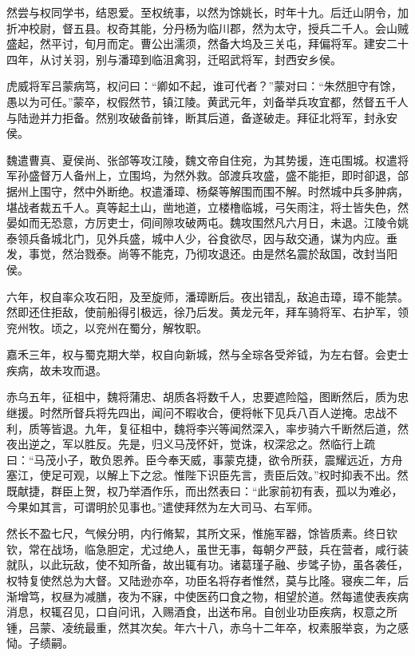 \documentclass[12pt,UTF8]{ctexbook}
\begin{document}
然尝与权同学书，结恩爱。至权统事，以然为馀姚长，时年十九。后迁山阴令，加折冲校尉，督五县。权奇其能，分丹杨为临川郡，然为太守，授兵二千人。会山贼盛起，然平讨，旬月而定。曹公出濡须，然备大坞及三关屯，拜偏将军。建安二十四年，从讨关羽，别与潘璋到临沮禽羽，迁昭武将军，封西安乡侯。

虎威将军吕蒙病笃，权问曰：“卿如不起，谁可代者？”蒙对曰：“朱然胆守有馀，愚以为可任。”蒙卒，权假然节，镇江陵。黄武元年，刘备举兵攻宜都，然督五千人与陆逊并力拒备。然别攻破备前锋，断其后道，备遂破走。拜征北将军，封永安侯。

魏遣曹真、夏侯尚、张郃等攻江陵，魏文帝自住宛，为其势援，连屯围城。权遣将军孙盛督万人备州上，立围坞，为然外救。郃渡兵攻盛，盛不能拒，即时卻退，郃据州上围守，然中外断绝。权遣潘璋、杨粲等解围而围不解。时然城中兵多肿病，堪战者裁五千人。真等起土山，凿地道，立楼橹临城，弓矢雨注，将士皆失色，然晏如而无恐意，方厉吏士，伺间隙攻破两屯。魏攻围然凡六月日，未退。江陵令姚泰领兵备城北门，见外兵盛，城中人少，谷食欲尽，因与敌交通，谋为内应。垂发，事觉，然治戮泰。尚等不能克，乃彻攻退还。由是然名震於敌国，改封当阳侯。

六年，权自率众攻石阳，及至旋师，潘璋断后。夜出错乱，敌追击璋，璋不能禁。然即还住拒敌，使前船得引极远，徐乃后发。黄龙元年，拜车骑将军、右护军，领兖州牧。顷之，以兖州在蜀分，解牧职。

嘉禾三年，权与蜀克期大举，权自向新城，然与全琮各受斧钺，为左右督。会吏士疾病，故未攻而退。

赤乌五年，征柤中，魏将蒲忠、胡质各将数千人，忠要遮险隘，图断然后，质为忠继援。时然所督兵将先四出，闻问不暇收合，便将帐下见兵八百人逆掩。忠战不利，质等皆退。九年，复征柤中，魏将李兴等闻然深入，率步骑六千断然后道，然夜出逆之，军以胜反。先是，归义马茂怀奸，觉诛，权深忿之。然临行上疏曰：“马茂小子，敢负恩养。臣今奉天威，事蒙克捷，欲令所获，震耀远近，方舟塞江，使足可观，以解上下之忿。惟陛下识臣先言，责臣后效。”权时抑表不出。然既献捷，群臣上贺，权乃举酒作乐，而出然表曰：“此家前初有表，孤以为难必，今果如其言，可谓明於见事也。”遣使拜然为左大司马、右军师。

然长不盈七尺，气候分明，内行脩絜，其所文采，惟施军器，馀皆质素。终日钦钦，常在战场，临急胆定，尤过绝人，虽世无事，每朝夕严鼓，兵在营者，咸行装就队，以此玩敌，使不知所备，故出辄有功。诸葛瑾子融、步骘子协，虽各袭任，权特复使然总为大督。又陆逊亦卒，功臣名将存者惟然，莫与比隆。寝疾二年，后渐增笃，权昼为减膳，夜为不寐，中使医药口食之物，相望於道。然每遣使表疾病消息，权辄召见，口自问讯，入赐酒食，出送布帛。自创业功臣疾病，权意之所锺，吕蒙、凌统最重，然其次矣。年六十八，赤乌十二年卒，权素服举哀，为之感恸。子绩嗣。
\end{document}
